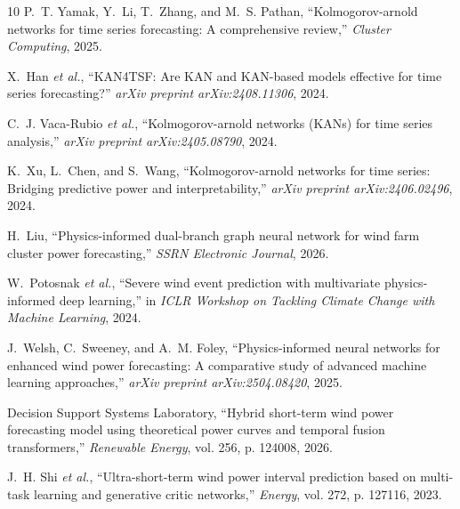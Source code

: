 \begin{thebibliography}{10}
P.~T. Yamak, Y.~Li, T.~Zhang, and M.~S. Pathan, ``Kolmogorov-arnold networks for time series forecasting: A comprehensive review,'' \emph{Cluster Computing}, 2025.

X.~Han \emph{et al.}, ``{KAN4TSF}: Are {KAN} and {KAN}-based models effective for time series forecasting?'' \emph{arXiv preprint arXiv:2408.11306}, 2024.

C.~J. Vaca-Rubio \emph{et al.}, ``Kolmogorov-arnold networks ({KANs}) for time series analysis,'' \emph{arXiv preprint arXiv:2405.08790}, 2024.

K.~Xu, L.~Chen, and S.~Wang, ``Kolmogorov-arnold networks for time series: Bridging predictive power and interpretability,'' \emph{arXiv preprint arXiv:2406.02496}, 2024.

H.~Liu, ``Physics-informed dual-branch graph neural network for wind farm cluster power forecasting,'' \emph{SSRN Electronic Journal}, 2026.

W.~Potosnak \emph{et al.}, ``Severe wind event prediction with multivariate physics-informed deep learning,'' in \emph{ICLR Workshop on Tackling Climate Change with Machine Learning}, 2024.

J.~Welsh, C.~Sweeney, and A.~M. Foley, ``Physics-informed neural networks for enhanced wind power forecasting: A comparative study of advanced machine learning approaches,'' \emph{arXiv preprint arXiv:2504.08420}, 2025.

Decision Support Systems Laboratory, ``Hybrid short-term wind power forecasting model using theoretical power curves and temporal fusion transformers,'' \emph{Renewable Energy}, vol. 256, p. 124008, 2026.

J.~H. Shi \emph{et al.}, ``Ultra-short-term wind power interval prediction based on multi-task learning and generative critic networks,'' \emph{Energy}, vol. 272, p. 127116, 2023.

\end{thebibliography}